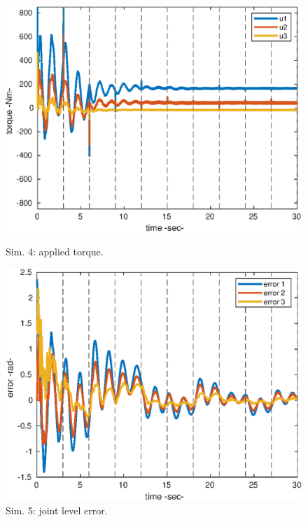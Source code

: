 \begin{center}
\begin{figure}[h!]
\begin{minipage}[h!]{0.45\linewidth}
\begin{center}
\hspace{-0.1cm}\includegraphics[scale=0.51]{figures/3_1_effort.eps}
\caption{\label{4_u}Sim. 4: applied torque.}
\end{center}
\end{minipage}
\hspace{0.5cm}
\begin{minipage}[h!]{0.45\linewidth}
\begin{center}
\hspace{-0.1cm}\includegraphics[scale=0.52]{figures/3_2_error.eps}
\caption{\label{5_e}Sim. 5: joint level error.}
\vspace{1cm}

\end{center}
\end{minipage}
\end{figure}
\end{center}
